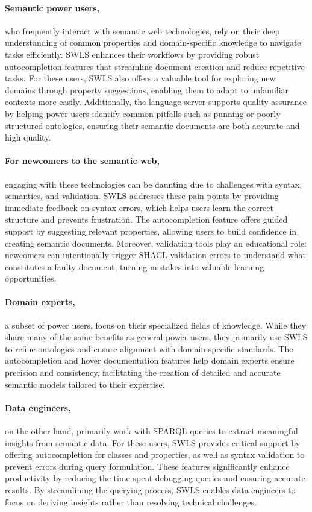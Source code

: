 \paragraph{Semantic power users,} who frequently interact with semantic web technologies, rely on their deep understanding of common properties and domain-specific knowledge to navigate tasks efficiently.
SWLS enhances their workflows by providing robust autocompletion features that streamline document creation and reduce repetitive tasks.
For these users, SWLS also offers a valuable tool for exploring new domains through property suggestions, enabling them to adapt to unfamiliar contexts more easily. 
Additionally, the language server supports quality assurance by helping power users identify common pitfalls such as punning or poorly structured ontologies, ensuring their semantic documents are both accurate and high quality.

\paragraph{For newcomers to the semantic web,} engaging with these technologies can be daunting due to challenges with syntax, semantics, and validation. 
SWLS addresses these pain points by providing immediate feedback on syntax errors, which helps users learn the correct structure and prevents frustration.
The autocompletion feature offers guided support by suggesting relevant properties, allowing users to build confidence in creating semantic documents.
Moreover, validation tools play an educational role: newcomers can intentionally trigger SHACL validation errors to understand what constitutes a faulty document,
turning mistakes into valuable learning opportunities.

\paragraph{Domain experts,} a subset of power users, focus on their specialized fields of knowledge. 
While they share many of the same benefits as general power users, they primarily use SWLS to refine ontologies and ensure alignment with domain-specific standards. 
The autocompletion and hover documentation features help domain experts ensure precision and consistency, facilitating the creation of detailed and accurate semantic models tailored to their expertise.

\paragraph{Data engineers,} on the other hand, primarily work with SPARQL queries to extract meaningful insights from semantic data. 
For these users, SWLS provides critical support by offering autocompletion for classes and properties, as well as syntax validation to prevent errors during query formulation. 
These features significantly enhance productivity by reducing the time spent debugging queries and ensuring accurate results. 
By streamlining the querying process, SWLS enables data engineers to focus on deriving insights rather than resolving technical challenges.

